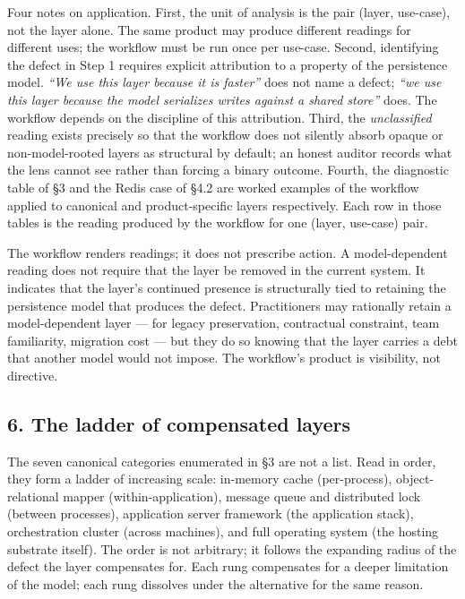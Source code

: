 \documentclass[
]{article}
\begin{document}
Four notes on application. First, the unit of analysis is the pair
(layer, use-case), not the layer alone. The same product may produce
different readings for different uses; the workflow must be run once per
use-case. Second, identifying the defect in Step 1 requires explicit
attribution to a property of the persistence model. \emph{``We use this
layer because it is faster''} does not name a defect; \emph{``we use
this layer because the model serializes writes against a shared store''}
does. The workflow depends on the discipline of this attribution. Third,
the \emph{unclassified} reading exists precisely so that the workflow
does not silently absorb opaque or non-model-rooted layers as structural
by default; an honest auditor records what the lens cannot see rather
than forcing a binary outcome. Fourth, the diagnostic table of §3 and
the Redis case of §4.2 are worked examples of the workflow applied to
canonical and product-specific layers respectively. Each row in those
tables is the reading produced by the workflow for one (layer, use-case)
pair.

The workflow renders readings; it does not prescribe action. A
model-dependent reading does not require that the layer be removed in
the current system. It indicates that the layer's continued presence is
structurally tied to retaining the persistence model that produces the
defect. Practitioners may rationally retain a model-dependent layer ---
for legacy preservation, contractual constraint, team familiarity,
migration cost --- but they do so knowing that the layer carries a debt
that another model would not impose. The workflow's product is
visibility, not directive.

\subsection{6. The ladder of compensated
layers}\label{the-ladder-of-compensated-layers}

The seven canonical categories enumerated in §3 are not a list. Read in
order, they form a ladder of increasing scale: in-memory cache
(per-process), object-relational mapper (within-application), message
queue and distributed lock (between processes), application server
framework (the application stack), orchestration cluster (across
machines), and full operating system (the hosting substrate itself). The
order is not arbitrary; it follows the expanding radius of the defect
the layer compensates for. Each rung compensates for a deeper limitation
of the model; each rung dissolves under the alternative for the same
reason.
\end{document}

